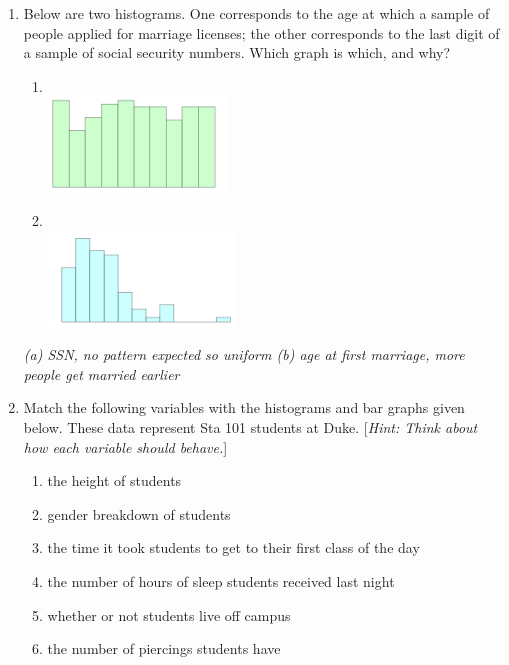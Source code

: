 \documentclass[12pt]{article}
\newcommand{\soln}[2]{\textit{\textcolor{custom_red}{#2}}}{}
\begin{document}
\begin{enumerate}

\item Below are two histograms. One corresponds to the age at which a sample of people applied for marriage licenses; the other corresponds to the last digit of a sample of social security numbers. Which graph is which, and why?

\begin{multicols}{2}

\begin{enumerate}

\item $\:$ \\
\includegraphics[height=1in]{figures/last_digit_SSN}

\item $\:$ \\
\includegraphics[height=1in]{figures/age_mar_lic}

\end{enumerate}

\end{multicols}

\soln{-1cm}{(a) SSN, no pattern expected so uniform (b) age at first marriage, more people get married earlier}

%

\item Match the following variables with the histograms and bar graphs given below. These data represent Sta 101 students at Duke. [\textit{Hint: Think about how each variable should behave.}]

\begin{multicols}{2}
\begin{enumerate}
\item the height of students
\item gender breakdown of students
\item the time it took students to get to their first class of the day
\item the number of hours of sleep students received last night
\item whether or not students live off campus
\item the number of piercings students have
\end{enumerate}
\end{multicols}
\clearpage
\begin{multicols}{3}


\end{multicols}
\end{enumerate}
\end{document}
